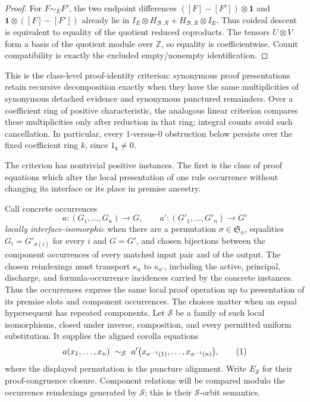 \documentclass[10pt,a4paper]{article}
\theoremstyle{plain}
\theoremstyle{definition}
\theoremstyle{remark}
\newcommand{\Base}{\mathcal B}
\newcommand{\Rules}{\mathcal R}
\newcommand{\Hlic}{H_{\Base,\Rules}}
\newcommand{\one}{\mathbf 1}
\newcommand{\eqtag}{\refstepcounter{equation}\tag{\theequation}}
\begin{document}
\begin{proof}
For \(F\sim_EF'\), the two endpoint differences
\(
([F]-[F'])\otimes\one
\)
and
\(
\one\otimes([F]-[F'])
\)
already lie in
\(
I_E\otimes\Hlic+\Hlic\otimes I_E
\).
Thus coideal descent is equivalent to equality of the quotient reduced
coproducts.  The tensors \(U\otimes V\) form a basis of the quotient module
over \(\mathbb Z\), so equality is coefficientwise.  Counit compatibility
is exactly the excluded empty/nonempty identification.
\end{proof}

This is the class-level proof-identity criterion: synonymous proof
presentations retain recursive decomposition exactly when they have the
same multiplicities of synonymous detached evidence and synonymous
punctured remainders.  Over a coefficient ring of positive
characteristic, the analogous linear criterion compares these
multiplicities only after reduction in that ring; integral counts avoid
such cancellation.  In particular, every \(1\)-versus-\(0\) obstruction below
persists over the fixed coefficient ring \(k\), since \(1_k\ne0\).

The criterion has nontrivial positive instances.  The first is the class
of proof equations which alter the local presentation of one rule
occurrence without changing its interface or its place in premise ancestry.

Call concrete occurrences
\[
 a:(G_1,\ldots,G_n)\longrightarrow G,
 \qquad
 a':(G'_1,\ldots,G'_n)\longrightarrow G'
\]
\emph{locally interface-isomorphic} when there are a permutation
\(\sigma\in\mathfrak S_n\), equalities
\(
G_i=G'_{\sigma(i)}
\)
for every \(i\) and \(G=G'\), and chosen bijections between the component
occurrences of every matched input pair and of the output.  The chosen
reindexings must transport \(\kappa_a\) to
\(\kappa_{a'}\), including the active, principal, discharge, and formula-occurrence
incidences carried by the concrete instances.  Thus the occurrences express
the same local proof operation up to presentation of its premise slots and
component occurrences.  The choices matter when an equal hypersequent has
repeated components.  Let \(\mathcal S\) be a family of such local
isomorphisms, closed under inverse, composition, and every permitted uniform
substitution.  It supplies the aligned corolla equations
\[
 a(x_1,\ldots,x_n)
 \ \sim_{\mathcal S}\
 a'\bigl(x_{\sigma^{-1}(1)},\ldots,
          x_{\sigma^{-1}(n)}\bigr),
\eqtag\label{eq:local-interface-symmetry}
\]
where the displayed permutation is the puncture alignment.  Write
\(E_{\mathcal S}\) for their proof-congruence closure.  Component relations
will be compared modulo the occurrence reindexings generated by
\(\mathcal S\); this is their \(\mathcal S\)-orbit semantics.
\end{document}
